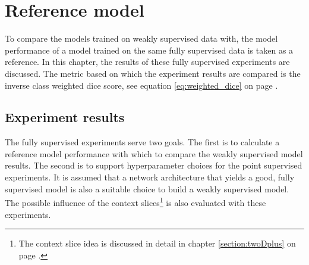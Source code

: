 \chapter{Reference model\label{sec:reference_model}}\thispagestyle{empty}
\par{
    To compare the models trained on weakly supervised data with, the model performance of a model trained on the same fully supervised data is taken as a reference.
    In this chapter, the results of these fully supervised experiments are discussed.
    The metric based on which the experiment results are compared is the inverse class weighted dice score, see equation \ref{eq:weighted_dice} on page \pageref{eq:weighted_dice}.
}


\section{Experiment results}
\par{
    The fully supervised experiments serve two goals.
    The first is to calculate a reference model performance with which to compare the weakly supervised model results.
    The second is to support hyperparameter choices for the point supervised experiments.
    It is assumed that a network architecture that yields a good, fully supervised model is also a suitable choice to build a weakly supervised model.
    The possible influence of the context slices\footnote{The context slice idea is discussed in detail in chapter \ref{section:twoDplus} on page \pageref{section:twoDplus}.} is also evaluated with these experiments.
}



